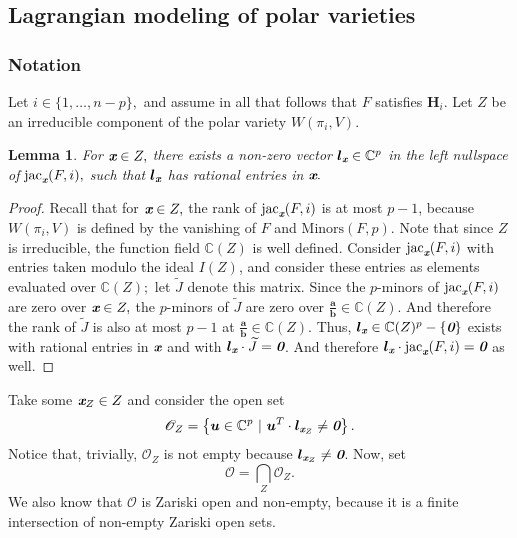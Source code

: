\documentclass[a4paper]{article}
\def\bz{\textit{\textbf{0}}}
\def\ub{{\bm u}}
\def\lb{{\bm l}}
\def\xb{\textit{\textbf{x}}}
\def\jt{\widetilde{J}}
\DeclareMathOperator{\jac}{jac}
\def\minors{\textrm{Minors}(F,p)}
\def\C{\mathbb{C}}
\def\Wi{W(\pi_i,V)}
\def\ji{\jac_{\xb}(F,i)}
\newtheorem{lemma}[theorem]{Lemma}
\begin{document}
\subsection{Lagrangian modeling of polar varieties}
%
%
%
\subsubsection{Notation}
Let $i \in \{1,\hdots,n-p\},$ and assume in all that follows that $F$ satisfies $\bm H_i$. Let $Z$ be an irreducible component of the polar variety $\Wi$.  
%
\begin{lemma}\label{lem:3.7}
For $\xb \in Z,$ there exists a non-zero vector $\lb_{\xb}\in \C^p$ in the left nullspace of $\ji,$ such that $\lb_{\xb}$ has rational entries in $\xb.$
\end{lemma}
%
\begin{proof}
Recall that for $\xb \in Z,$ the rank of $\ji$ is at most $p-1$, because $\Wi$ is defined by the vanishing of $F$ and $\minors$. Note that since $Z$ is irreducible, the function field $\C(Z)$ is well defined. Consider $\jac_{\xb}(F,i)$  with entries taken modulo the ideal $I(Z)$, and consider these entries as elements evaluated over $\C(Z);$ let $\jt$ denote this matrix. Since the $p$-minors of $\ji$ are zero over $\xb \in Z,$ the $p$-minors of $\jt$ are zero over $\frac{\bm a}{\bm b} \in \C(Z).$ And therefore the rank of $\jt$ is also at most $p-1$ at $\frac{\bm a}{\bm b} \in \C(Z).$ Thus, $\lb_{\xb} \in \C(Z)^p-\{\bz\}$ exists with rational entries in $\xb$ and with $\lb_{\xb} \cdot \jt = \bz$. And therefore $\lb_{\xb} \cdot \ji = \bz$ as well.
\end{proof}
%
\noindent
Take some $\xb_Z \in Z$ and consider the open set
\[
\mathscr{O}_{Z} = 
\left\{\ub \in \C^p~|~\ub^T\cdot \lb_{\xb_Z} \not = \textit{\textbf{0}}\right\}.
\]
Notice that, trivially, $\mathscr{O}_Z$ is not empty because $\lb_{\xb_Z} \not = \bz$.  Now, set
\[
\mathscr{O} = 
\bigcap_Z \mathscr{O}_{Z}.
\]
We also know that $\mathscr{O}$ is Zariski open and non-empty, because it is a finite intersection of non-empty Zariski open sets.
%
%
\end{document}
